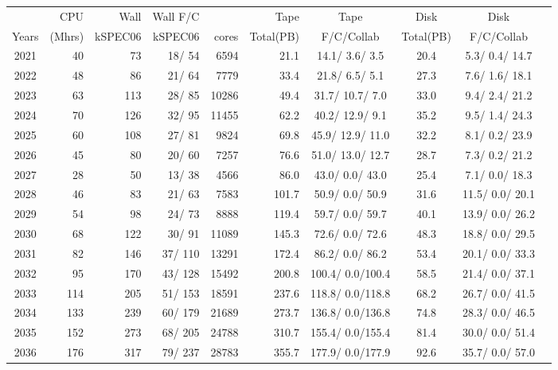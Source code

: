\documentclass[12pt]{article}
\begin{document}
\begin{table}
\footnotesize
 \centering \begin{tabular}[h]{crrrrrcccc}
 & CPU &Wall&Wall F/C&\qquad  & Tape\qquad& Tape\qquad  & Disk\qquad  & Disk\qquad \\
Years&(Mhrs)&kSPEC06&kSPEC06&cores& Total(PB)&F/C/Collab & Total(PB) &F/C/Collab\\
\hline
2021&	  40&	  73&	  18/  54&	  6594&	     21.1&	  14.1/  3.6/  3.5&	     20.4&	   5.3/  0.4/ 14.7\\
2022&	  48&	  86&	  21/  64&	  7779&	     33.4&	  21.8/  6.5/  5.1&	     27.3&	   7.6/  1.6/ 18.1\\
2023&	  63&	 113&	  28/  85&	 10286&	     49.4&	  31.7/ 10.7/  7.0&	     33.0&	   9.4/  2.4/ 21.2\\
2024&	  70&	 126&	  32/  95&	 11455&	     62.2&	  40.2/ 12.9/  9.1&	     35.2&	   9.5/  1.4/ 24.3\\
2025&	  60&	 108&	  27/  81&	  9824&	     69.8&	  45.9/ 12.9/ 11.0&	     32.2&	   8.1/  0.2/ 23.9\\
2026&	  45&	  80&	  20/  60&	  7257&	     76.6&	  51.0/ 13.0/ 12.7&	     28.7&	   7.3/  0.2/ 21.2\\
2027&	  28&	  50&	  13/  38&	  4566&	     86.0&	  43.0/  0.0/ 43.0&	     25.4&	   7.1/  0.0/ 18.3\\
2028&	  46&	  83&	  21/  63&	  7583&	    101.7&	  50.9/  0.0/ 50.9&	     31.6&	  11.5/  0.0/ 20.1\\
2029&	  54&	  98&	  24/  73&	  8888&	    119.4&	  59.7/  0.0/ 59.7&	     40.1&	  13.9/  0.0/ 26.2\\
2030&	  68&	 122&	  30/  91&	 11089&	    145.3&	  72.6/  0.0/ 72.6&	     48.3&	  18.8/  0.0/ 29.5\\
2031&	  82&	 146&	  37/ 110&	 13291&	    172.4&	  86.2/  0.0/ 86.2&	     53.4&	  20.1/  0.0/ 33.3\\
2032&	  95&	 170&	  43/ 128&	 15492&	    200.8&	 100.4/  0.0/100.4&	     58.5&	  21.4/  0.0/ 37.1\\
2033&	 114&	 205&	  51/ 153&	 18591&	    237.6&	 118.8/  0.0/118.8&	     68.2&	  26.7/  0.0/ 41.5\\
2034&	 133&	 239&	  60/ 179&	 21689&	    273.7&	 136.8/  0.0/136.8&	     74.8&	  28.3/  0.0/ 46.5\\
2035&	 152&	 273&	  68/ 205&	 24788&	    310.7&	 155.4/  0.0/155.4&	     81.4&	  30.0/  0.0/ 51.4\\
2036&	 176&	 317&	  79/ 237&	 28783&	    355.7&	 177.9/  0.0/177.9&	     92.6&	  35.7/  0.0/ 57.0\\

\end{tabular}
\end{table}
\end{document}
